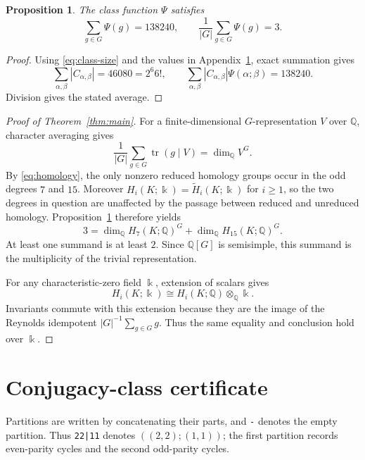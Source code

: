 \documentclass[11pt]{amsart}
\newtheorem{proposition}[theorem]{Proposition}
\newcommand{\Q}{\mathbb Q}
\newcommand{\stype}[1]{\texttt{#1}}
\begin{document}
\begin{proposition}\label{prop:average}
The class function $\Psi$ satisfies
\[
\sum_{g\in G}\Psi(g)=138240,
\qquad
\frac1{|G|}\sum_{g\in G}\Psi(g)=3.
\]
\end{proposition}

\begin{proof}
Using \eqref{eq:class-size} and the values in Appendix~\ref{app:table}, exact
summation gives
\[
\sum_{\alpha,\beta}|C_{\alpha,\beta}|=46080=2^6 6!,
\qquad
\sum_{\alpha,\beta}|C_{\alpha,\beta}|\Psi(\alpha;\beta)=138240.
\]
Division gives the stated average.
\end{proof}

\begin{proof}[Proof of Theorem~\ref{thm:main}]
For a finite-dimensional $G$-representation $V$ over $\Q$, character
averaging gives
\[
\frac1{|G|}\sum_{g\in G}\operatorname{tr}(g\mid V)=\dim_{\Q}V^G.
\]
By \eqref{eq:homology}, the only nonzero reduced homology groups occur in the
odd degrees $7$ and $15$. Moreover $H_i(K;\Bbbk)=\widetilde H_i(K;\Bbbk)$ for
$i\ge1$, so the two degrees in question are unaffected by the passage between
reduced and unreduced homology. Proposition~\ref{prop:average} therefore
yields
\[
3=\dim_{\Q}H_7(K;\Q)^G+
  \dim_{\Q}H_{15}(K;\Q)^G.
\]
At least one summand is at least $2$. Since $\Q[G]$ is semisimple, this
summand is the multiplicity of the trivial representation.

For any characteristic-zero field $\Bbbk$, extension of scalars gives
\[
H_i(K;\Bbbk)\cong H_i(K;\Q)\otimes_{\Q}\Bbbk.
\]
Invariants commute with this extension because they are the image of the
Reynolds idempotent $|G|^{-1}\sum_{g\in G}g$. Thus the same equality and
conclusion hold over $\Bbbk$.
\end{proof}

\appendix
\section{Conjugacy-class certificate}\label{app:table}

Partitions are written by concatenating their parts, and \stype{-} denotes
the empty partition. Thus \stype{22|11} denotes $((2,2);(1,1))$; the first
partition records even-parity cycles and the second odd-parity cycles.
\end{document}
